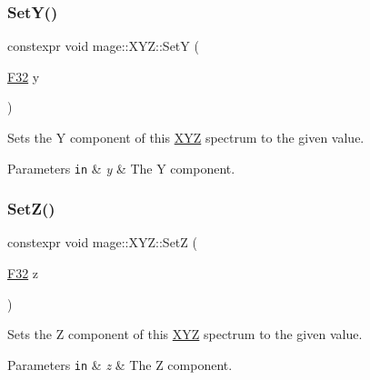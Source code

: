 \subsubsection{\texorpdfstring{Set\+Y()}{SetY()}}
{\footnotesize\ttfamily constexpr void mage\+::\+X\+Y\+Z\+::\+SetY (\begin{DoxyParamCaption}\item[{\mbox{\hyperlink{namespacemage_aa97e833b45f06d60a0a9c4fc22ae02c0}{F32}}}]{y }\end{DoxyParamCaption})\hspace{0.3cm}{\ttfamily [noexcept]}}

Sets the Y component of this \mbox{\hyperlink{structmage_1_1_x_y_z}{X\+YZ}} spectrum to the given value.


\begin{DoxyParams}[1]{Parameters}
\mbox{\tt in}  & {\em y} & The Y component. \\
\hline
\end{DoxyParams}
\mbox{\label{structmage_1_1_x_y_z_aa2321d3d9fbf155581827794c68781bd}} 
\subsubsection{\texorpdfstring{Set\+Z()}{SetZ()}}
{\footnotesize\ttfamily constexpr void mage\+::\+X\+Y\+Z\+::\+SetZ (\begin{DoxyParamCaption}\item[{\mbox{\hyperlink{namespacemage_aa97e833b45f06d60a0a9c4fc22ae02c0}{F32}}}]{z }\end{DoxyParamCaption})\hspace{0.3cm}{\ttfamily [noexcept]}}

Sets the Z component of this \mbox{\hyperlink{structmage_1_1_x_y_z}{X\+YZ}} spectrum to the given value.


\begin{DoxyParams}[1]{Parameters}
\mbox{\tt in}  & {\em z} & The Z component. \\
\hline
\end{DoxyParams}
